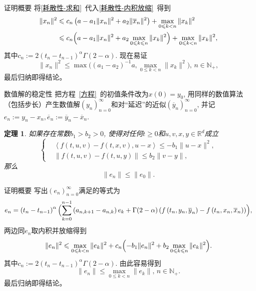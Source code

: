\documentclass[aspectratio=16 9, 10pt, notheorems]{ctexbeamer}
\let\oldcref\cref
\renewcommand{\cref}[1]{\oldcref{#1}~}
\let\oldeqref\eqref
\renewcommand{\eqref}[1]{~\oldeqref{#1}~}
\newcommand{\mainEquation}{方程\eqref{方程}}
\newcommand{\realset}{\mathbb{R}}
\newcommand{\positiveinteger}{\mathbb{N_+}}
\newtheorem{theorem}{定理}
\begin{document}
\begin{frame}{证明概要}
    将\cref{耗散性-求和}代入\cref{耗散性-内积放缩}得到
    \begin{align*}
        \|x_n\|^2 &\leqslant c_n \left(a-a_1 \|x_n\|^2 + a_2 \|\overline x_n\|^2\right) + \max_{0\leqslant k<n} \|x_k\|^2
        \\ &\leqslant c_n \Bigl(a-a_1 \|x_n\|^2 + a_2 \max_{0\leqslant k\leqslant n} \|x_k\|^2\Bigr) + \max_{0\leqslant k<n} \|x_k\|^2,
    \end{align*}
    其中$c_n:=2\left(t_n-t_{n-1}\right)^\alpha \Gamma(2-\alpha)$. 现在易证
    \begin{equation*}
        \|x_n\|^2\leqslant \max\bigl((a_1-a_2)^{-1}a,\max_{0\leqslant k<n}\|x_k\|^2\bigr),\,n\in\positiveinteger,
    \end{equation*}
    最后归纳即得结论。
\end{frame}

\begin{frame}{数值解的稳定性}
    把\mainEquation 的初值条件改为$x(0)=y_0$, 用同样的数值算法（包括步长）产生数值解$\left(y_n\right)_{n=0}^\infty$和对“延迟”的近似$\left(\overline y_n\right)_{n=0}^\infty$, 并记$e_n:=y_n-x_n, \overline e_n:=\overline y_n-\overline x_n$.
    \begin{theorem}\label{stability}
        如果存在常数$b_1>b_2>0$, 使得对任何$t\geqslant 0$和$u,v,x,y\in \realset^d$成立
        \begin{equation*}
            \left\{
                \begin{aligned}
                    &\left<f(t,u,v)-f(t,x,v),u-x\right>\leqslant -b_1 \|u-x\|^2,
                    \\ &\|f(t,u,v)-f(t,u,y)\|\leqslant b_2 \|v-y\|,
                \end{aligned}
            \right.
        \end{equation*}
        那么
        \begin{equation*}
            \|e_n\|\leqslant \|e_0\|.
        \end{equation*}
    \end{theorem}
\end{frame}
\begin{frame}{证明概要}
    写出$\left(e_n\right)_{n=0}^\infty$满足的等式为
    \begin{equation*}
        e_n=\left(t_n-t_{n-1}\right)^\alpha\Bigl(\sum_{k=0}^{n-1}\left(a_{n,k+1}-a_{n,k}\right)e_k+\Gamma(2-\alpha)\left(f\left(t_n,y_n,\overline y_n\right)-f\left(t_n,x_n,\overline x_n\right)\right)\Bigr),
    \end{equation*}
    两边同$e_n$取内积并放缩得到
    \begin{equation*}
        \|e_n\|^2\leqslant \max_{0\leqslant k<n} \|e_k\|^2+c_n\Bigl(-b_1 \|e_n\|^2+b_2 \max_{0\leqslant k\leqslant n} \|e_k\|^2\Bigr).
    \end{equation*}
    其中$c_n:=2\left(t_n-t_{n-1}\right)^\alpha\Gamma(2-\alpha)$. 由此容易得到
    \begin{equation*}
        \|e_n\|\leqslant\max_{0\leqslant k< n} \|e_k\|,\,n\in\positiveinteger.
    \end{equation*}
    最后归纳即得结论。
\end{frame}
\end{document}
